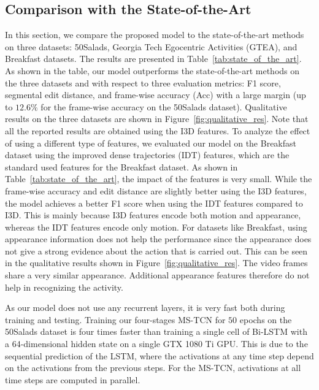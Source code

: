 \documentclass[10pt,twocolumn,letterpaper]{article}
\begin{document}
\subsection{Comparison with the State-of-the-Art}
In this section, we compare the proposed model to the state-of-the-art 
methods on three datasets: 50Salads, Georgia Tech Egocentric Activities (GTEA), 
and Breakfast datasets. The results are presented in Table~\ref{tab:state_of_the_art}. 
As shown in the table, our model outperforms the state-of-the-art methods on the three 
datasets and with respect to three evaluation metrics: F1 score, segmental edit distance, 
and frame-wise accuracy (Acc) with a large margin (up to $12.6 \%$ for the frame-wise accuracy 
on the 50Salads dataset). Qualitative results on the three datasets are shown in 
Figure~\ref{fig:qualitative_res}. Note that all the reported results are obtained using the 
I3D features. To analyze the effect of using a different type of features, we evaluated our 
model on the Breakfast dataset using the improved dense trajectories (IDT) features, which are 
the standard used features for the Breakfast dataset. As shown in Table~\ref{tab:state_of_the_art}, 
the impact of the features is very small. While the frame-wise accuracy and edit distance are 
slightly better using the I3D features, the model achieves a better F1 score when using the IDT 
features compared to I3D. This is mainly because I3D features encode both motion and appearance, 
whereas the IDT features encode only motion. For datasets like Breakfast, using appearance 
information does not help the performance since the appearance does not give a strong evidence 
about the action that is carried out. This can be seen in the qualitative results shown in 
Figure~\ref{fig:qualitative_res}. The video frames share a very similar appearance. Additional 
appearance features therefore do not help in recognizing the activity.

As our model does not use any recurrent layers, it is very fast both during training and testing. 
Training our four-stages MS-TCN for $50$ epochs on the 50Salads dataset is four times faster than 
training a single cell of Bi-LSTM with a 64-dimensional hidden state on a single GTX 1080 Ti GPU. 
This is due to the sequential prediction of the LSTM, where the activations at any time step 
depend on the activations from the previous steps. For the MS-TCN, activations at all time steps 
are computed in parallel.
\end{document}
